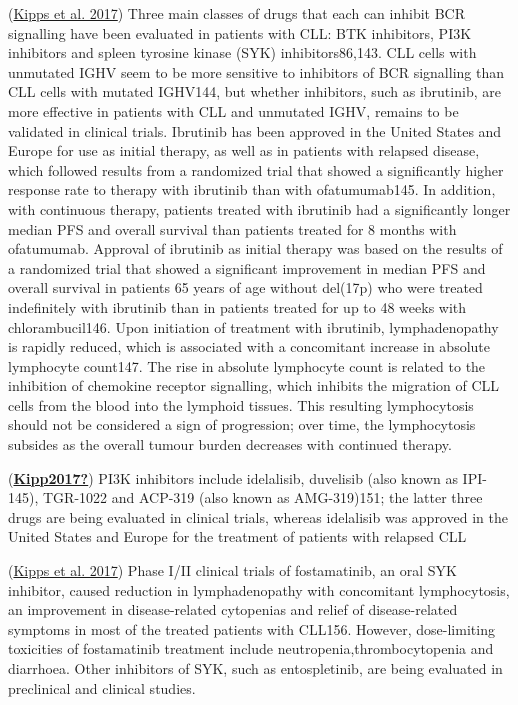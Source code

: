 \documentclass[11pt, a4paper, twosided]{book}
\begin{document}
(\protect\hyperlink{ref-Kipps2017}{Kipps et al. 2017})
Three main classes of drugs that each can inhibit BCR signalling have been evaluated in patients with CLL: BTK inhibitors, PI3K inhibitors and spleen tyrosine kinase (SYK) inhibitors86,143. CLL cells with unmutated IGHV seem to be more sensitive to inhibitors of BCR signalling than CLL cells with mutated IGHV144, but whether inhibitors, such as ibrutinib, are more effective in patients with CLL and unmutated IGHV, remains to be validated in clinical trials.
Ibrutinib has been approved in the United States and Europe for use as initial therapy, as well as in patients with relapsed disease, which followed results from a randomized trial that showed a significantly higher response rate to therapy with ibrutinib than with ofatumumab145. In addition, with continuous therapy, patients treated with ibrutinib had a significantly longer median PFS and overall survival than patients treated for 8 months with ofatumumab. Approval of ibrutinib as initial therapy was based on the results of a randomized trial that showed a significant improvement in median PFS and overall survival in patients 65 years of age without del(17p) who were treated indefinitely with ibrutinib than in patients treated for up to 48 weeks with chlorambucil146.
Upon initiation of treatment with ibrutinib, lymphadenopathy is rapidly reduced, which is associated with a concomitant increase in absolute lymphocyte count147. The rise in absolute lymphocyte count is related to the inhibition of chemokine receptor signalling, which inhibits the migration of CLL cells from the blood into the lymphoid tissues. This resulting lymphocytosis should not be considered a sign of progression; over time, the lymphocytosis subsides as the overall tumour burden decreases with continued therapy.

(\protect\hyperlink{ref-Kipp2017}{\textbf{Kipp2017?}})
PI3K inhibitors include idelalisib, duvelisib (also known as IPI-145), TGR-1022 and ACP-319 (also known as AMG-319)151; the latter three drugs are being evaluated in clinical trials, whereas idelalisib was approved in the United States and Europe for the treatment of patients with relapsed CLL

(\protect\hyperlink{ref-Kipps2017}{Kipps et al. 2017})
Phase I/II clinical trials of fostamatinib, an oral SYK inhibitor, caused reduction in lymphadenopathy with concomitant lymphocytosis, an improvement in disease-related cytopenias and relief of disease-related symptoms in most of the treated patients with CLL156. However, dose-limiting toxicities of fostamatinib treatment include neutropenia,thrombocytopenia and diarrhoea. Other inhibitors of SYK, such as entospletinib, are being evaluated in preclinical and clinical studies.
\end{document}
